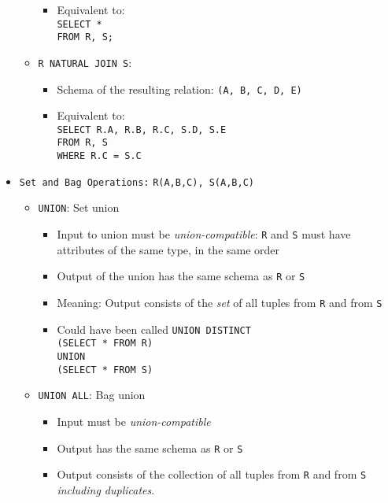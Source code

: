 \documentclass[landscape,8pt]{extarticle}
\newcommand{\code}{\lstinline}
\begin{document}
\begin{multicols}{4}
\begin{itemize}
\begin{itemize}
\begin{itemize}
            \item Equivalent to: \\
            \code{SELECT *} \\
            \code{FROM R, S;}
        \end{itemize}
        \item \code{R NATURAL JOIN S}:
        \begin{itemize}
            \item Schema of the resulting relation: \code{(A, B, C, D, E)}
            \item Equivalent to: \\
            \code{SELECT R.A, R.B, R.C, S.D, S.E} \\
            \code{FROM R, S} \\
            \code{WHERE R.C = S.C}
        \end{itemize}
    \end{itemize}
    \item \code{Set and Bag Operations:} \code{R(A,B,C), S(A,B,C)}
    \begin{itemize}
        \item \code{UNION}: Set union
        \begin{itemize}
            \item Input to union must be \emph{union-compatible}: \code{R} and \code{S} must have
            attributes of the same type, in the same order
            \item Output of the union has the same schema as \code{R} or \code{S}
            \item Meaning: Output consists of the \emph{set} of all tuples from \code{R} and from \code{S}
            \item Could have been called \code{UNION DISTINCT} \\
            \code{(SELECT * FROM R)} \\
            \code{UNION} \\
            \code{(SELECT * FROM S)} 
        \end{itemize}
        \item \code{UNION ALL}: Bag union
        \begin{itemize}
            \item Input must be \emph{union-compatible}
            \item Output has the same schema as \code{R} or \code{S}
            \item Output consists of the collection of all tuples from \code{R} and from \code{S} \emph{including duplicates}.

\end{itemize}
\end{itemize}
\end{itemize}
\end{multicols}
\end{document}
